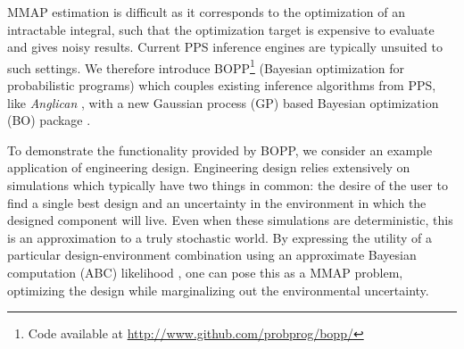 MMAP estimation is difficult as it corresponds to the optimization of an intractable integral, such that the optimization target is expensive to evaluate and gives noisy results.  Current PPS inference engines are typically unsuited to such settings.  We therefore introduce BOPP\footnote{Code available at \href{http://www.github.com/probprog/bopp/}{\url{http://www.github.com/probprog/bopp/}} \vspace{7pt}} 
(Bayesian optimization for probabilistic programs) which couples existing inference algorithms from PPS, like \emph{Anglican} \citep{wood2014new}, with a new Gaussian process (GP) \citep{rasmussen2006gaussian} based Bayesian optimization (BO) package \citep{gutmann2016bayesian, jones1998efficient, osborne2009gaussian, shahriari2016unbounded}.  

To demonstrate the functionality provided by BOPP, we consider an example application of engineering design.  Engineering design relies extensively on simulations which typically have two things in common: the desire of the user to find a single best design and an uncertainty in the environment in which the designed component will live. Even when these simulations are deterministic, this is an approximation to a truly stochastic world. By expressing the utility of a particular design-environment combination using an approximate Bayesian computation (ABC) likelihood \citep{csillery2010approximate}, one can pose this as a MMAP problem, optimizing the design while marginalizing out the environmental uncertainty.

\flushbottom

